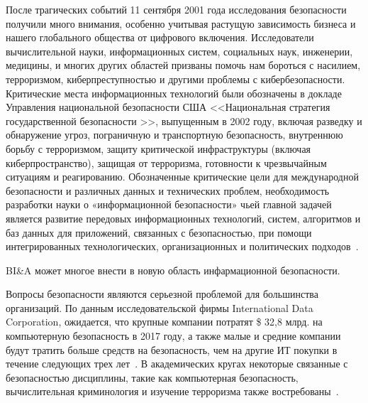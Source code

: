 После трагических событий 11 сентября 2001 года исследования безопасности получили много внимания, особенно учитывая
растущую зависимость бизнеса и нашего глобального общества от
цифрового включения. Исследователи вычислительной науки,
информационных систем, социальных наук, инженерии, медицины,
и многих других областей призваны помочь
нам бороться с насилием, терроризмом, киберпреступностью и другими
проблемы с кибербезопасности. Критические места информационных технологий были обозначены в докладе Управления национальной безопасности США
<<Национальная стратегия государственной безопасности >>, выпущенным в 2002 году,
включая разведку и обнаружение угроз, пограничную и транспортную
безопасность, внутреннюю борьбу с терроризмом, защиту критической инфраструктуры
(включая киберпространство), защищая от терроризма, готовности к чрезвычайным ситуациям и реагированию.
Обозначенные критические цели для международной безопасности и
различных данных и технических проблем, необходимость разработки
науки о «информационной безопасности» чьей главной задачей является развитие передовых информационных технологий, систем, алгоритмов и баз данных для приложений, связанных с безопасностью, при помощи интегрированных технологических,
организационных и политических подходов~\cite{Chen:2006}.

BI\&A может многое внести в новую область инфармационной безопасности.

Вопросы безопасности являются серьезной проблемой для большинства организаций.
По данным исследовательской фирмы International Data Corporation,
ожидается, что крупные компании потратят \$ 32,8 млрд. на
компьютерную безопасность в 2017 году, а также малые и средние
компании будут тратить больше средств на безопасность, чем на другие ИТ
покупки в течение следующих трех лет~\cite{Perlroth:2012}.
В академических кругах некоторые связанные с безопасностью дисциплины, такие как
компьютерная безопасность, вычислительная криминология и изучение
терроризма также востребованы~\cite{Brantingham:2011}.

